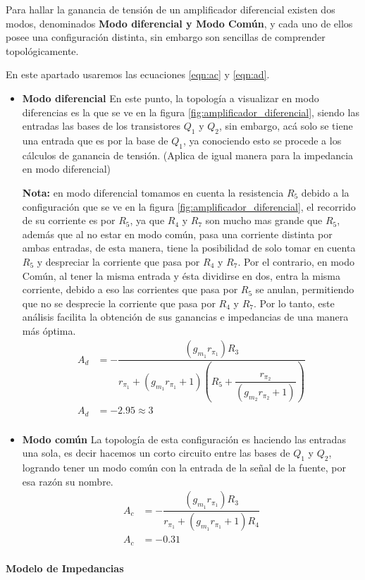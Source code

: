 \begin{enumerate}
        Para hallar la ganancia de tensión de un amplificador diferencial existen dos modos, denominados \textbf{Modo diferencial y Modo Común}, y cada uno de ellos posee una configuración distinta, sin embargo son sencillas de comprender topológicamente.

        En este apartado usaremos las ecuaciones \ref{eqn:ac} y  \ref{eqn:ad}.

        \begin{itemize}
          \item \textbf{Modo diferencial}
                En este punto, la topología a visualizar en modo diferencias es la que se ve en la figura \ref{fig:amplificador_diferencial}, siendo las entradas las bases de los transistores $Q_1$ y $Q_2$, sin embargo, acá solo se tiene una entrada que es por la base de $Q_1$, ya conociendo esto se procede a los cálculos de ganancia de tensión. (Aplica de igual manera para la impedancia en modo diferencial)


                \textbf{Nota:} en modo diferencial tomamos en cuenta la resistencia $R_5$ debido a la configuración que se ve en la figura \ref{fig:amplificador_diferencial}, el recorrido de su corriente es por $R_5$, ya que $R_4$ y $R_7$ son mucho mas grande que $R_5$, además que al no estar en modo común, pasa una corriente distinta por ambas entradas, de esta manera, tiene la posibilidad de solo tomar en cuenta $R_5$ y despreciar la corriente que pasa por $R_4$ y $R_7$. Por el contrario, en modo Común, al tener la misma entrada y ésta dividirse en dos, entra la misma corriente, debido a eso las corrientes que pasa por $R_5$ se anulan, permitiendo que no se desprecie la corriente que pasa por $R_4$ y $R_7$. Por lo tanto, este análisis facilita la obtención de sus ganancias e impedancias de una manera más óptima.
                \begin{align*}
                  A_d & = -\dfrac{(g_{m_1}r_{\pi_1})R_3}{r_{\pi_1}+(g_{m_1}r_{\pi_1}+1)\left(R_{5}+\dfrac{r_{\pi_2}}{(g_{m_2}r_{\pi_2}+1)}\right) } \\[0.2cm]
                  A_d & = -2.95 \approx 3                                                                                                           \\[0.2cm]
                \end{align*}
          \item \textbf{Modo común}
                La topología de esta configuración es haciendo las entradas una sola, es decir hacemos un corto circuito entre las bases de $Q_1$ y $Q_2$, logrando tener un modo común con la entrada de la señal de la fuente, por esa razón su nombre.
                \begin{align*}
                  A_c & =- \dfrac{(g_{m_1}r_{\pi_1})R_3}{r_{\pi_1}+(g_{m_1}r_{\pi_1}+1)R_{4}} \\[0.2cm]
                  A_c & = -0.31                                                               \\[0.2cm]
                \end{align*}
        \end{itemize}
        \newpage
        \textbf{Modelo de Impedancias}


\end{enumerate}
